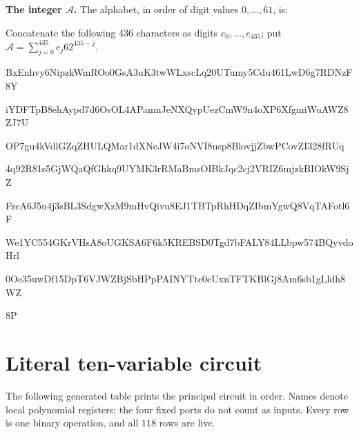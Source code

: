 \documentclass[11pt]{article}
\theoremstyle{remark}
\begin{document}
\textbf{The integer $\mathcal A$.}
The alphabet, in order of digit values $0,\ldots,61$, is:\par
{}\par
Concatenate the following 436 characters as digits $e_0,\ldots,e_{435}$;
put $\mathcal A=\sum_{j=0}^{435}e_j62^{435-j}$.\par
\begingroup\fontsize{7.7}{8.2}\selectfont\ttfamily
BxEnhvy6NipzkWmROo0GsA3uK3twWLxscLq20UTumy5Cdu461LwD6g7RDNzF8Y\par
iYDFTpB8ehAypd7d6OsOL4APamnJeNXQypUezCmW9n4oXP6XfgmiWuAWZ8ZJ7U\par
OP7gu4kVdlGZqZHULQMar1dXNeJW4i7oNVI8usp8BlovjjZbwPCovZI328fRUq\par
4q92R81s5GjWQaQfGhkq9UYMK3rRMaBmsOIBkJqc2cj2VRIZ6mjzkBIOkW9SjZ\par
FzeA6J5u4j3sBL3SdgwXzM9mHvQivu8EJ1TBTpRhHDqZIbmYgwQ8VqTAFotl6F\par
We1YC554GKrVHsA8oUGKSA6F6k5KREBSD0Tgd7bFALY84LLbpw574BQyvdoHrl\par
0Oe35uwDf15DpT6VJWZBjSbHPpPAINYTte0eUxnTFTKBlGj8Am6sb1gLldh8WZ\par
8P\par
\endgroup

\endgroup



\section{Literal ten-variable circuit}
The following generated table prints the principal circuit in order.
Names denote local polynomial registers; the four fixed ports do not count
as inputs. Every row is one binary operation, and all \(118\) rows are live.
\end{document}

